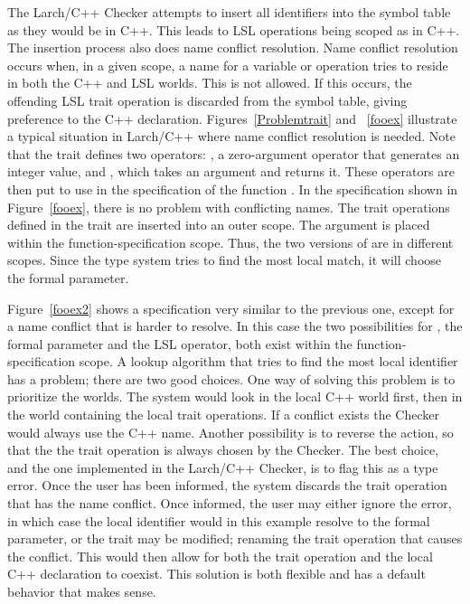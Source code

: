 The Larch/C++ Checker attempts to insert all identifiers into the
symbol table as they would be in C++. This leads to LSL operations
being scoped as in C++. The insertion process also does name conflict
resolution. Name conflict resolution occurs when, in a given scope, a
name for a variable or operation tries to reside in both the C++ and
LSL worlds. This is not allowed. If this occurs, the offending LSL
trait operation is discarded from the symbol table, giving preference
to the C++ declaration. Figures~\ref{Problemtrait} and ~\ref{fooex}
illustrate a typical situation in Larch/C++ where name conflict
resolution is needed. Note that the trait defines two operators:
, a zero-argument operator that generates an integer value, and
, which takes an argument and returns it. These
operators are then put to use in the specification of the function
. In the specification shown in Figure~\ref{fooex}, there
is no problem with conflicting names. The trait operations defined in
the trait are inserted into an outer scope. The argument  is placed within the function-specification scope. Thus, the two
versions of  are in different scopes. Since the type
system tries to find the most local match, it will choose the formal
parameter. 

Figure~\ref{fooex2} shows a specification very similar to the previous
one, except for a name conflict that is harder to resolve.  In this
case the two possibilities for , the formal parameter and
the LSL operator, both exist within the function-specification scope. A
lookup algorithm that tries to find the most local identifier has a
problem; there are two good choices. One way of solving this
problem is to prioritize the worlds. The system would look in the
local C++ world first, then in the world containing the local trait
operations. If a conflict exists the Checker would always use the C++
name. Another possibility is to reverse the action, so that the the trait
operation is always chosen by the Checker.
The best choice, and the one implemented
in the Larch/C++ Checker, is to flag this as a type error. Once the
user has been informed, the system discards the trait operation that
has the name conflict. Once informed, the user may either ignore the
error, in which case the local identifier would in this example
resolve to the formal parameter, or the trait may be modified; renaming
the trait operation that causes the conflict. This would then allow
for both the trait operation and the local C++ declaration to
coexist. This solution is both flexible and has a default behavior
that makes sense.


